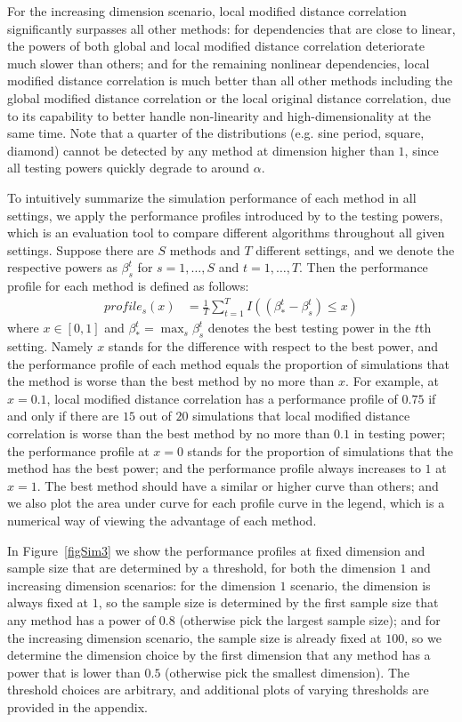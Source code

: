 \documentclass[12pt]{article}
\begin{document}
For the increasing dimension scenario, local modified distance correlation significantly surpasses all other methods: for dependencies that are close to linear, the powers of both global and local modified distance correlation deteriorate much slower than others; and for the remaining nonlinear dependencies, local modified distance correlation is much better than all other methods including the global modified distance correlation or the local original distance correlation, due to its capability to better handle non-linearity and high-dimensionality at the same time. Note that a quarter of the distributions (e.g. sine period, square, diamond) cannot be detected by any method at dimension higher than $1$, since all testing powers quickly degrade to around $\alpha$.

To intuitively summarize the simulation performance of each method in all settings, we apply the performance profiles introduced by \cite{DolanMore2002} to the testing powers, which is an evaluation tool to compare different algorithms throughout all given settings. Suppose there are $S$ methods and $T$ different settings, and we denote the respective powers as $\beta_{s}^{t}$ for $s=1,\ldots,S$ and $t=1,\ldots,T$. Then the performance profile for each method is defined as follows:
\begin{align*}
profile_{s}(x) &= \frac{1}{T} \sum_{t=1}^{T} I((\beta_{*}^{t}-\beta_{s}^{t}) \leq x)
\end{align*}
where $x \in [0,1]$ and $\beta_{*}^{t} =\max_{s} \beta_{s}^{t}$ denotes the best testing power in the $t$th setting. Namely $x$ stands for the difference with respect to the best power, and the performance profile of each method equals the proportion of simulations that the method is worse than the best method by no more than $x$. For example, at $x=0.1$, local modified distance correlation has a performance profile of $0.75$ if and only if there are $15$ out of $20$ simulations that local modified distance correlation is worse than the best method by no more than $0.1$ in testing power; the performance profile at $x=0$ stands for the proportion of simulations that the method has the best power; and the performance profile always increases to $1$ at $x=1$. The best method should have a similar or higher curve than others; and we also plot the area under curve for each profile curve in the legend, which is a numerical way of viewing the advantage of each method.

In Figure~\ref{figSim3} we show the performance profiles at fixed dimension and sample size that are determined by a threshold, for both the dimension $1$ and increasing dimension scenarios: for the dimension $1$ scenario, the dimension is always fixed at $1$, so the sample size is determined by the first sample size that any method has a power of $0.8$ (otherwise pick the largest sample size); and for the increasing dimension scenario, the sample size is already fixed at $100$, so we determine the dimension choice by the first dimension that any method has a power that is lower than $0.5$ (otherwise pick the smallest dimension). The threshold choices are arbitrary, and additional plots of varying thresholds are provided in the appendix.
\end{document}
